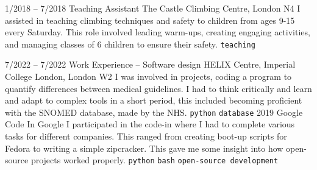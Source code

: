 \documentclass[9pt]{developercv} %
\begin{document}
\vspace{-10 pt}
\begin{entrylist}
	\entry
		{1/2018 -- 7/2018}
		{Teaching Assistant}
		{The Castle Climbing Centre, London N4}
		{
			I assisted in teaching climbing techniques and safety to children from ages 9-15 every Saturday.
			This role involved leading warm-ups, creating engaging activities, and managing classes of 6 children to ensure their safety.
			\newline
			\texttt{teaching}
		}
\end{entrylist}


\vspace{-10 pt}
\begin{entrylist}
	\entry
	{7/2022 -- 7/2022}
	{Work Experience – Software design}
	{HELIX Centre, Imperial College London, London W2}
	{
		I was involved in projects, coding a program to quantify differences between medical guidelines.
		I had to think critically and learn and adapt to complex tools in a short period, this included becoming proficient with the SNOMED database, made by the NHS. 
		\newline
		\texttt{python} \slashsep \texttt{database}
	}
	\entry
        {2019}
		{Google Code In}
		{Google}
		{
			I participated in the code-in where I had to complete various tasks for different companies. 
			This ranged from creating boot-up scripts for Fedora to writing a simple zipcracker. 
			This gave me some insight into how open-source projects worked properly. 
        	\newline
			\texttt{python} \slashsep \texttt{bash} \slashsep \texttt{open-source development}
		}
		
\end{entrylist}
\end{document}
